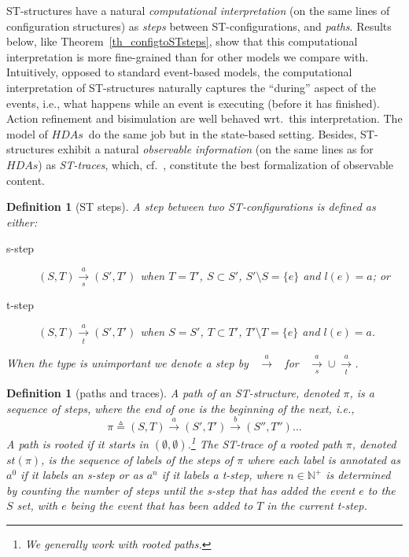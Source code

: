 \documentclass[submission,copyright,creativecommons]{eptcs}
\newtheorem{definition}[theorem]{Definition}
\newcommand\HDAs{\ensuremath{\mathit{HDAs}}}
\newcommand\defequal{\ensuremath{\stackrel{\vartriangle}{=}}}
\newcommand\sttrace[1]{\ensuremath{\mathit{st}(#1)}}
\newcommand{\transition}[1]{\ensuremath{\xrightarrow{#1}}}
\newcommand{\transitions}[1]{\ensuremath{\xrightarrow[s]{#1}}}
\newcommand{\transitiont}[1]{\ensuremath{\xrightarrow[t]{#1}}}
\begin{document}
ST-structures have a natural \textit{computational interpretation} (on the same lines of configuration structures) as \textit{steps} between ST-configurations, and \textit{paths}. Results below, like Theorem~\ref{th_configtoSTsteps}, show that this computational interpretation is more fine-grained than for  other models we compare with. 
Intuitively, opposed to standard event-based models, the computational interpretation of ST-structures naturally captures the ``during'' aspect of the events, i.e., what happens while an event is executing (before it has finished). Action refinement and bisimulation are well behaved wrt.\ this interpretation. The model of \HDAs\ do the same job but in the state-based setting.
Besides, ST-structures exhibit a natural \textit{observable information} (on the same lines as for \HDAs) as \textit{ST-traces}, which, cf.~\cite[Sec.7.3]{Glabbeek06HDA}, constitute the best formalization of observable content.


\begin{definition}[ST steps]\label{def_STsteps}
A step between two ST-configurations is defined as either:
\begin{description}
\item[s-step] $(S,T)\transitions{a}(S',T')$ when $T=T'$, $S\subset S'$, $S'\setminus S=\{e\}$ and $l(e)=a$; or
\item[t-step] $(S,T)\transitiont{a}(S',T')$ when $S=S'$, $T\subset T'$, $T'\setminus T=\{e\}$ and $l(e)=a$.
\end{description}
When the type is unimportant we denote a step by \, $\transition{a}$ \, for \, $\transitions{a}\cup\transitiont{a}$.
\end{definition}



\begin{definition}[paths and traces]\label{def_pathstrace}
A \emph{path} of an ST-structure, denoted $\pi$, is a sequence of steps, where the end of one is the beginning of the next, i.e.,
\[
\pi\defequal(S,T)\transition{a}(S',T')\transition{b}(S'',T'')\dots
\]
A path is \emph{rooted} if it starts in $(\emptyset,\emptyset)$.\footnote{We generally work with rooted paths.}
The \emph{ST-trace of a rooted path $\pi$}, denoted $\sttrace{\pi}$, is the sequence of labels of the steps of $\pi$ where each label is annotated as $a^{0}$ if it labels an s-step or as $a^{n}$ if it labels a t-step, where $n\in\mathbb{N}^{+}$ is determined by counting the number of steps until the s-step that has added the event $e$ to the $S$ set, with $e$ being the event that has been added to $T$ in the current t-step.
\end{definition}
\end{document}
